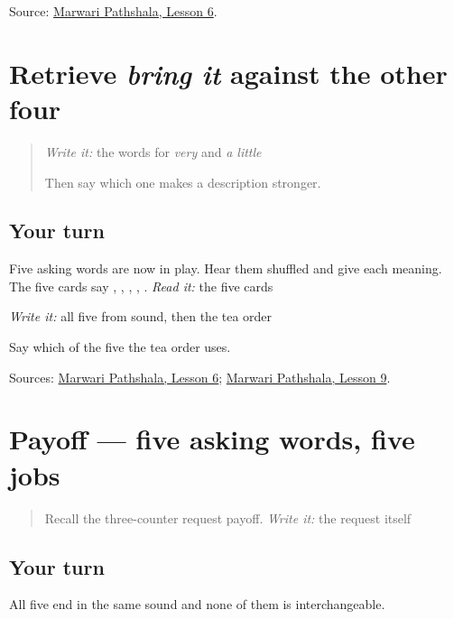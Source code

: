 \begin{tcolorbox}[breakable,colback=teal!4,colframe=teal!35!black,title={Before you move on}]
Source: \href{https://www.marwaripathshala.com/marwari-lesson-6-english}{Marwari Pathshala, Lesson 6}.
\end{tcolorbox}
\section[Practice]{Retrieve \emph{bring it} against the other four}

\label{lesson:MW-R25-bring-two}



\begin{quote}
\emph{Write it:} the words for \emph{very} and \emph{a little}

Then say which one makes a description stronger.
\end{quote}

\subsection*{Your turn}
Five asking words are now in play. Hear them shuffled and give each meaning. The five cards say \textbf{}, \textbf{}, \textbf{}, \textbf{}, \textbf{}. \emph{Read it:} the five cards

\emph{Write it:} all five from sound, then the tea order

Say which of the five the tea order uses.

\begin{tcolorbox}[breakable,colback=teal!4,colframe=teal!35!black,title={Before you move on}]
Sources: \href{https://www.marwaripathshala.com/marwari-lesson-6-english}{Marwari Pathshala, Lesson 6}; \href{https://www.marwaripathshala.com/marwari-lesson-9-english}{Marwari Pathshala, Lesson 9}.
\end{tcolorbox}
\section[Practice]{Payoff — five asking words, five jobs}

\label{lesson:MW-C25-request-five}



\begin{quote}
Recall the three-counter request payoff. \emph{Write it:} the request itself
\end{quote}

\subsection*{Your turn}
All five end in the same sound and none of them is interchangeable.

